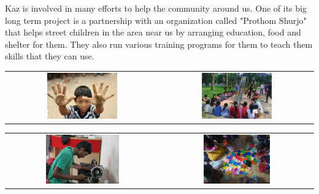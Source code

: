 Kaz is involved in many efforts to help the community around us.
One of its big long term project is a partnership with an organization called "Prothom Shurjo" that helps street children in the area near us by arranging education, food and shelter for them.
They also run various training programs for them to teach them skills that they can use.

\setlength{\tabcolsep}{4pt}

\begin{center}
    \begin{tabular}{cc}
    \includegraphics[width=0.475\textwidth]{images/Chapter2/help1.png} & \includegraphics[width=0.475\textwidth]{images/Chapter2/help2.png}
    \end{tabular}
\end{center}

\begin{center}
    \begin{tabular}{cc}
    \includegraphics[width=0.5\textwidth]{images/Chapter2/help3.png} & \includegraphics[width=0.45\textwidth]{images/Chapter2/help4.png}
    \end{tabular}
\end{center}

